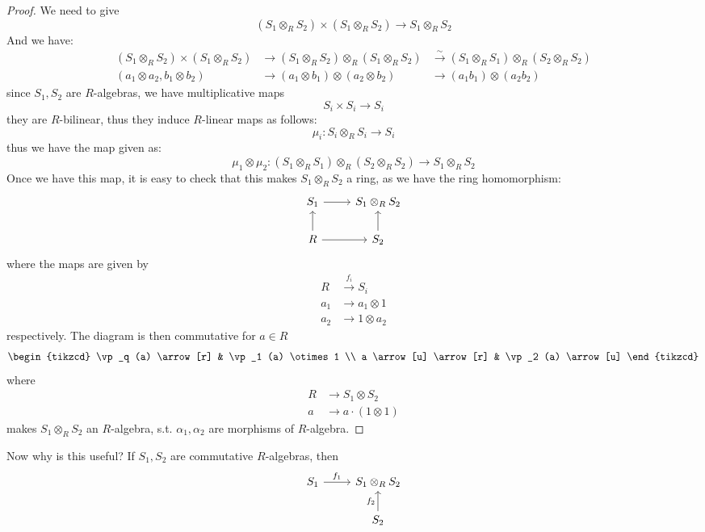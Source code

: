 \begin{proof}
	We need to give
	\[
		(S_1 \otimes_R S_2) \times (S_1 \otimes_R S_2) \to S_1 \otimes_R S_2
	\]
	And we have:
	\[
		\begin{aligned}
			(S_1 \otimes_R S_2) \times (S_1 \otimes_R S_2)
			 & \to (S_1 \otimes_R S_2) \otimes_R (S_1 \otimes_R S_2)
			 & \xrightarrow{\sim} (S_1 \otimes_R S_1) \otimes_R (S_2 \otimes_R S_2) \\
			(a_1 \otimes a_2, b_1 \otimes b_2)
			 & \to (a_1 \otimes b_1) \otimes (a_2 \otimes b_2)
			 & \to (a_1 b_1) \otimes (a_2 b_2)
		\end{aligned}
	\]
	since \( S_1, S_2 \) are \( R \)-algebras, we have multiplicative maps
	\[
		S_i \times S_i \to S_i
	\]
	they are \( R \)-bilinear, thus they induce \( R \)-linear maps as follows:
	\[
		\mu_i : S_i \otimes_R S_i \to S_i
	\]
	thus we have the map given as:
	\[
		\mu_1 \otimes \mu_2 : (S_1\otimes_R S_1) \otimes_R (S_2 \otimes_R S_2) \to S_1 \otimes_R S_2
	\]
	Once we have this map, it is easy to check that this makes \( S_1 \otimes_R S_2 \) a ring, as we
	have the ring homomorphism:
	\[
		\begin{tikzcd}
			S_1 \arrow[r] & S_1 \otimes_R S_2 \\
			R \arrow[r] \arrow[u] & S_2 \arrow[u]
		\end{tikzcd}
	\]
	where the maps are given by
	\[
		\begin{aligned}
			R   & \xrightarrow{f_i} S_i \\
			a_1 & \to a_1 \otimes 1     \\
			a_2 & \to 1\otimes a_2
		\end{aligned}
	\]
	respectively. The diagram is then commutative for \( a \in R \)
	\[
		\begin{tikzcd}
			\vp_q (a) \arrow[r] & \vp_1 (a) \otimes 1 \\
			a \arrow[u] \arrow[r] & \vp_2 (a) \arrow[u]
		\end{tikzcd}
	\]
	where
	\[
		\begin{aligned}
			R & \to S_1 \otimes S_2      \\
			a & \to a\cdot (1 \otimes 1)
		\end{aligned}
	\]
	makes \( S_1 \otimes_R S_2 \) an \( R \)-algebra, s.t. \( \alpha_1, \alpha_2 \) are morphisms of \( R \)-algebra.
\end{proof}
Now why is this useful? If \( S_1, S_2 \) are commutative \( R \)-algebras, then
\[
	\begin{tikzcd}
		S_1 \arrow[r, "f_1"] & S_1 \otimes_R S_2 \\
		& S_2 \arrow[u, "f_2"]
	\end{tikzcd}
\]
